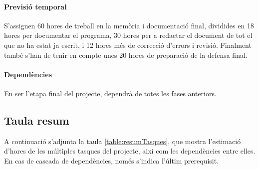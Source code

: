 \documentclass[a4paper]{report}
\begin{document}
	\paragraph{\quad Previsió temporal} S'assignen 60 hores de treball en la memòria i documentació final, dividides en 18 hores per documentar el programa, 30 hores per a redactar el document de tot el que no ha estat ja escrit, i 12 hores més de correcció d'errors i revisió. Finalment també s'han de tenir en compte unes 20 hores de preparació de la defensa final.
	\paragraph{\quad Dependències} En ser l'etapa final del projecte, dependrà de totes les fases anteriors.
	
	\newpage
	\subsection{Taula resum}
	A continuació s'adjunta la taula \ref{table:resumTasques}, que mostra l'estimació d'hores de les múltiples tasques del projecte, així com les dependències entre elles. En cas de cascada de dependències, només s'indica l'últim prerequisit.
\end{document}
